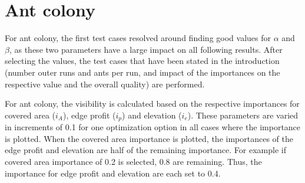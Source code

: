 \section{Ant colony}
%
%
%	


For ant colony, the first test cases resolved around finding good values for $\alpha$ and $\beta$, as these two parameters have a large impact on all following results.
After selecting the values, the test cases that have been stated in the introduction (number outer runs and ants per run, and impact of the importances on the respective value and the overall quality) are performed.

For ant colony, the visibility is calculated based on the respective importances for covered area ($i_A$), edge profit ($i_p$) and elevation ($i_e$).
These parameters are varied in increments of 0.1 for one optimization option in all cases where the importance is plotted.
When the covered area importance is plotted, the importances of the edge profit and elevation are half of the remaining importance.
For example if covered area importance of 0.2 is selected, 0.8 are remaining.
Thus, the importance for edge profit and elevation are each set to 0.4.



